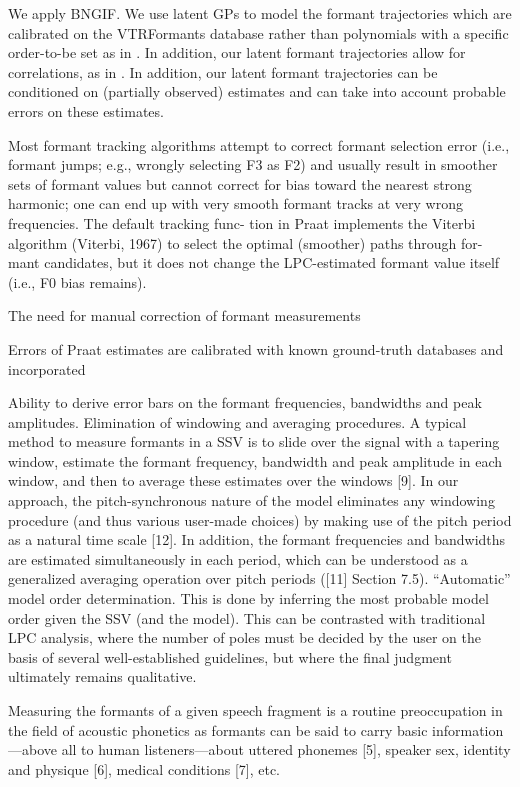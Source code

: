 \begin{chaptersections}{%
We apply BNGIF.
}
We use latent GPs to model the formant trajectories which are calibrated on the VTRFormants database rather than polynomials with a specific order-to-be set as in \citep{Gowda2020}.
In addition, our latent formant trajectories allow for correlations, as in \citep{Mehta2012}.
In addition, our latent formant trajectories can be conditioned on (partially observed) estimates and can take into account probable errors on these estimates.

Most formant tracking algorithms attempt to correct
formant selection error (i.e., formant jumps; e.g., wrongly
selecting F3 as F2) and usually result in smoother sets of
formant values but cannot correct for bias toward the nearest
strong harmonic; one can end up with very smooth formant
tracks at very wrong frequencies. The default tracking func-
tion in Praat implements the Viterbi algorithm (Viterbi,
1967) to select the optimal (smoother) paths through for-
mant candidates, but it does not change the LPC-estimated
formant value itself (i.e., F0 bias remains). \citep{Whalen2022}

The need for manual correction of formant measurements

Errors of Praat estimates are calibrated with known ground-truth databases and incorporated

Ability to derive error bars on the formant frequencies, bandwidths and peak amplitudes.
Elimination of windowing and averaging procedures. A typical method to measure formants in a
SSV is to slide over the signal with a tapering window, estimate the formant frequency, bandwidth
and peak amplitude in each window, and then to average these estimates over the windows [9].
In our approach, the pitch-synchronous nature of the model eliminates any windowing procedure
(and thus various user-made choices) by making use of the pitch period as a natural time scale [12].
In addition, the formant frequencies and bandwidths are estimated simultaneously in each period,
which can be understood as a generalized averaging operation over pitch periods ([11] Section 7.5).
“Automatic” model order determination. This is done by inferring the most probable model order
given the SSV (and the model). This can be contrasted with traditional LPC analysis, where the
number of poles must be decided by the user on the basis of several well-established guidelines,
but where the final judgment ultimately remains qualitative.

Measuring the formants of a given speech fragment is a routine preoccupation in the field of acoustic
phonetics as formants can be said to carry basic information—above all to human listeners—about
uttered phonemes [5], speaker sex, identity and physique [6], medical conditions [7], etc.


\end{chaptersections}
